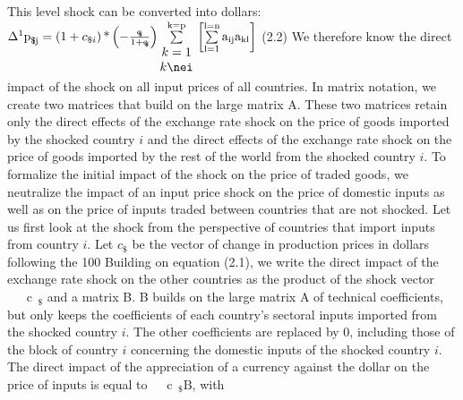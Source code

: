 \documentclass[11pt,a4paper]{article}
\begin{document}
This level shock can be converted into dollars:
	${{\Delta }^{1}}{{\text{p}}_{\text{ }\!\!\$\!\!\text{ij}}}=\left(1+{{c}_{\$i}}\right)\text{*}\left(-\frac{{{\text{c}}_{\text{}\!\!\$\!\!\text{i}}}}{1+{{\text{c}}_{\text{}\!\!\$\!\!\text{i}}}}\right)\underset{\begin{matrix}k=1\\k\nei\\\end{matrix}}{\overset{\text{k}=\text{p}}{\mathop\sum}}\,\left[\underset{\text{l}=1}{\overset{\text{l}=\text{n}}{\mathop\sum}}\,{{\text{a}}_{\text{ij}}}{{\text{a}}_{\text{kl}}}\right]$
 (2.2)
We therefore know the direct impact of the shock on all input prices of all countries.
In matrix notation, we create two matrices that build on the large matrix A. These two matrices retain only the direct effects of the exchange rate shock on the price of goods imported by the shocked country $i$ and the direct effects of the exchange rate shock on the price of goods imported by the rest of the world from the shocked country $i$. To formalize the initial impact of the shock on the price of traded goods, we neutralize the impact of an input price shock on the price of domestic inputs as well as on the price of inputs traded between countries that are not shocked.
Let us first look at the shock from the perspective of countries that import inputs from country $i$.
Let ${{c}_{\$}}$ be the vector of change in production prices in dollars following the 100%
Building on equation (2.1), we write the direct impact of the exchange rate shock on the other countries as the product of the shock vector $\text{ }\!\!~\!\!\text{ }{{\text{c}}_{\text{ }\!\!\$\!\!\text{}}}$ and a matrix B. B builds on the large matrix A of technical coefficients, but only keeps the coefficients of each country's sectoral inputs imported from the shocked country $i$. The other coefficients are replaced by 0, including those of the block of country $i$ concerning the domestic inputs of the shocked country $i$. The direct impact of the appreciation of a currency against the dollar on the price of inputs is equal to$\text{ }\!\!~\!\!\text{ }{{\text{c}}_{\text{ }\!\!\$\!\!\text{}}}\text{B}$, with
\end{document}
